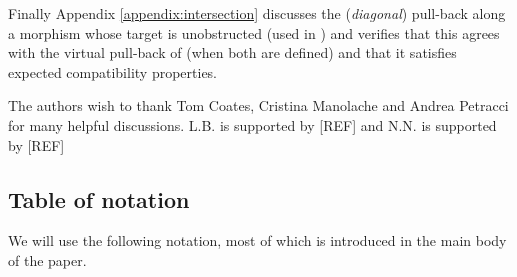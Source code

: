 Finally Appendix \ref{appendix:intersection} discusses the (\emph{diagonal}) pull-back along a morphism whose target is unobstructed (used in \cite{Ga}) and verifies that this agrees with the virtual pull-back of \cite{Manolache-Pull} (when both are defined) and that it satisfies expected compatibility properties.


\begin{acknowledgements} The authors wish to thank Tom Coates, Cristina Manolache and Andrea Petracci for many helpful discussions. L.B. is supported by [REF] and N.N. is supported by [REF]
\end{acknowledgements}

\subsection{Table of notation} We will use the following notation, most of which is introduced in the main body of the paper.
